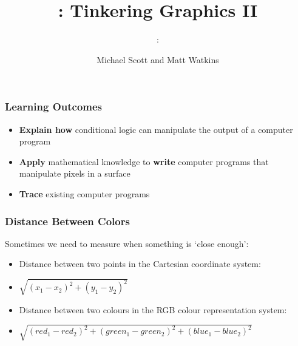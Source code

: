 	\usepackage{../../beamerthemeFalmouthGamesAcademy}
\usepackage{multimedia}
\graphicspath{ {../../} }


\usepackage[normalem]{ulem}
\usepackage{wasysym}

\usepackage{pdfpages}

\usetikzlibrary{arrows,automata}

\title{\sessionnumber: Tinkering Graphics II}
\subtitle{\modulecode: \moduletitle}
\author{Michael Scott and Matt Watkins}



{\tiny }


\maketitle

\begin{frame}
	\frametitle{Learning Outcomes}
	\begin{itemize}
		\item \textbf{Explain how} conditional logic can manipulate the output of a computer program
		\item \textbf{Apply} mathematical knowledge to \textbf{write} computer programs that manipulate pixels in a surface
		\item \textbf{Trace} existing computer programs
	\end{itemize}
\end{frame}

\begin{frame}
	\frametitle{Distance Between Colors}
	
	Sometimes we need to measure when something is `close enough':
	
	\begin{itemize}		
		\item Distance between two points in the Cartesian coordinate system:
		\item $\sqrt{(x_{1} - x_{2})^2 + (y_{1} - y_{2})^2}$
		\item Distance between two colours in the RGB colour representation system:
		\item $\sqrt{(red_{1} - red_{2})^2 + (green_{1} - green_{2})^2 + (blue_{1} - blue_{2})^2}$
	\end{itemize}
\end{frame}

